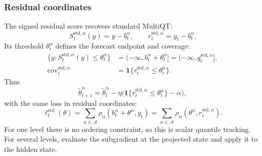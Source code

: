 \documentclass[11pt,a4paper]{article}
\newcommand{\A}{\mathcal{A}}
\newcommand{\ind}{\mathbf{1}}
\newcommand{\std}{\mathrm{std}}
\DeclareMathOperator{\cov}{cov}
\theoremstyle{definition}
\theoremstyle{remark}
\begin{document}
\subsubsection{Residual coordinates}
The signed residual score recovers standard MultiQT:
\begin{equation}
 S_t^{\std,\alpha}(y)=y-b_t^\alpha,\qquad
 r_t^{\std,\alpha}=y_t-b_t^\alpha.
 \label{eq:standard-score}
\end{equation}
Its threshold $\theta_t^\alpha$ defines the forecast endpoint and coverage:
\begin{align}
 \{y:S_t^{\std,\alpha}(y)\le\theta_t^\alpha\}
 &=(-\infty,b_t^\alpha+\theta_t^\alpha]
 =(-\infty,q_t^{\std,\alpha}],\label{eq:residual-inversion}\\
 \cov_t^{\std,\alpha}
 &=\ind\{r_t^{\std,\alpha}\le\theta_t^\alpha\}.
 \label{eq:standard-coverage}
\end{align}
Thus
\begin{equation}
 \tilde\theta_{t+1}^\alpha=\tilde\theta_t^\alpha
 -\eta\bigl(\ind\{r_t^{\std,\alpha}\le\theta_t^\alpha\}-\alpha\bigr),
 \label{eq:residual-update}
\end{equation}
with the same loss in residual coordinates:
\begin{equation}
 \ell_t^\std(\theta)
 =\sum_{\alpha\in\A}\rho_\alpha(b_t^\alpha+\theta^\alpha,y_t)
 =\sum_{\alpha\in\A}\rho_\alpha(\theta^\alpha,r_t^{\std,\alpha}).
 \label{eq:standard-loss}
\end{equation}
For one level there is no ordering constraint, so this is scalar
quantile tracking. For several levels, evaluate the subgradient at the
projected state and apply it to the hidden state.
\end{document}
